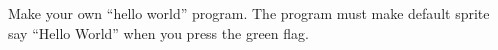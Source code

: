 Make your own ``hello world'' program. The program must make default sprite say ``Hello World'' when you press the green flag.